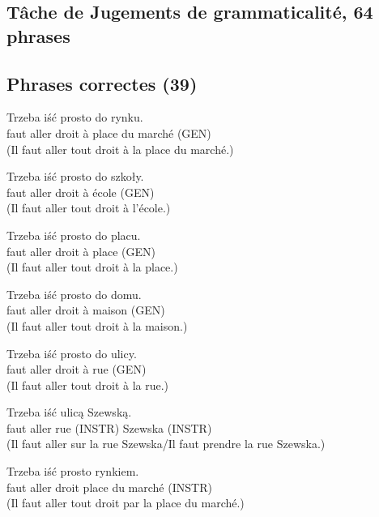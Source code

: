 \documentclass[output=paper]{langscibook}
\begin{document}
\begin{otherlanguage}{french}
\begin{paperappendix}
\section{Tâche de Jugements de grammaticalité, 64 phrases}

\subsection{Phrases correctes (39)}


\begin{exe}
\gll Trzeba   iść   prosto   do   rynku.\\
    faut     aller   droit   à   {place du marché (GEN)}\\
\glt (Il faut aller tout droit à la place du marché.)

\gll Trzeba   iść   prosto   do   szkoły.\\
      faut    aller  droit  à  {école (GEN)}\\
\glt (Il faut aller tout droit à l’école.)

\gll Trzeba   iść   prosto do   placu.\\
      faut    aller  droit  à  {place (GEN)}\\
\glt (Il faut aller tout droit à la place.)

\gll Trzeba   iść   prosto do   domu.\\
      faut    aller  droit  à  {maison (GEN)}\\
\glt (Il faut aller tout droit à la maison.)

\gll Trzeba   iść   prosto do   ulicy.\\
      faut    aller  droit  à  {rue (GEN)}\\
\glt (Il faut aller tout droit à la rue.)

\gll Trzeba   iść   ulicą     Szewską.\\
      faut    aller   {rue (INSTR)}  {Szewska (INSTR)}\\
\glt (Il faut aller sur la rue Szewska/Il faut prendre la rue Szewska.)

\gll Trzeba   iść   prosto     rynkiem.\\
      faut    aller  droit    {place du marché (INSTR)}\\
\glt (Il faut aller tout droit par la place du marché.)


\end{exe}
\end{paperappendix}
\end{otherlanguage}
\end{document}
